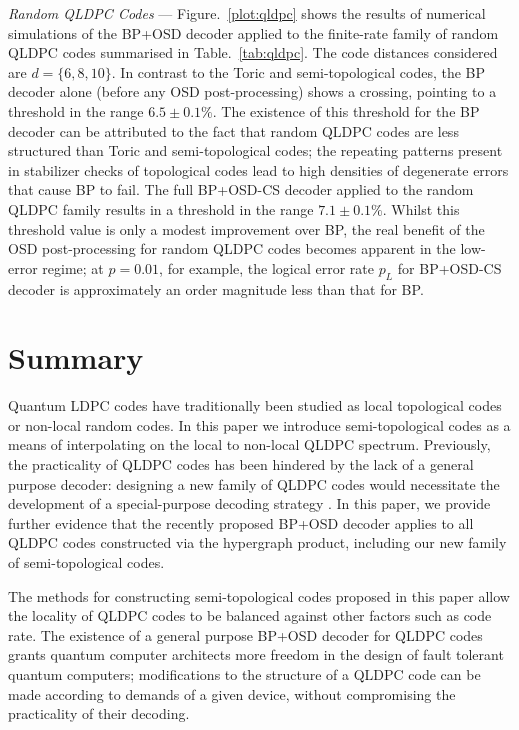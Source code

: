 \documentclass[%
 reprint,
superscriptaddress,
nofootinbib,
 amsmath,amssymb,
secnumarabic
]{revtex4-1}
\begin{document}
\textit{Random QLDPC Codes} --- Figure.~\ref{plot:qldpc} shows the results of numerical simulations of the BP+OSD decoder applied to the finite-rate family of random QLDPC codes summarised in Table.~\ref{tab:qldpc}. The code distances considered are $d=\{6,8,10\}$. In contrast to the Toric and semi-topological codes, the BP decoder alone (before any OSD post-processing) shows a crossing, pointing to a threshold in the range $6.5\pm0.1\%$. The existence of this threshold for the BP decoder can be attributed to the fact that random QLDPC codes are less structured than Toric and semi-topological codes; the repeating patterns present in stabilizer checks of topological codes lead to high densities of degenerate errors that cause BP to fail. The full BP+OSD-CS decoder applied to the random QLDPC family results in a threshold in the range $7.1\pm0.1\%$. Whilst this threshold value is only a modest improvement over BP, the real benefit of the OSD post-processing for random QLDPC codes becomes apparent in the low-error regime; at $p=0.01$, for example, the logical error rate $p_L$ for BP+OSD-CS decoder is approximately an order magnitude less than that for BP.  

    

\section{Summary}\label{sec:summary}

Quantum LDPC codes have traditionally been studied as local topological codes or non-local random codes. In this paper we introduce semi-topological codes as a means of interpolating on the local to non-local QLDPC spectrum. Previously, the practicality of QLDPC codes has been hindered by the lack of a general purpose decoder: designing a new family of QLDPC codes would necessitate the development of a special-purpose decoding strategy \cite{fawzi2018efficient,grospellier2018numerical}. In this paper, we provide further evidence that the recently proposed BP+OSD decoder \cite{Panteleev_2019} applies to all QLDPC codes constructed via the hypergraph product, including our new family of semi-topological codes.

The methods for constructing semi-topological codes proposed in this paper allow the locality of QLDPC codes to be balanced against other factors such as code rate. The existence of a general purpose BP+OSD decoder for QLDPC codes grants quantum computer architects more freedom in the design of fault tolerant quantum computers; modifications to the structure of a QLDPC code can be made according to demands of a given device, without compromising the practicality of their decoding.
\end{document}

